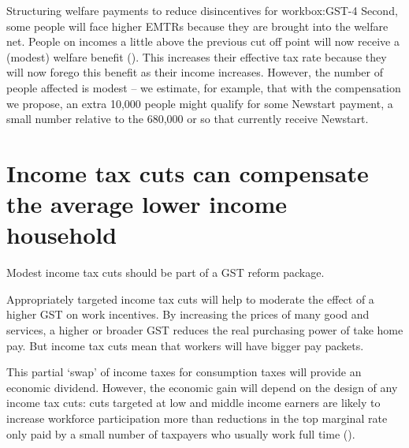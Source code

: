\begin{bigboxC*}{Structuring welfare payments to reduce disincentives for work}{box:GST-4}
Second, some people will face higher EMTRs because they are brought into the welfare net. People on incomes a little above the previous cut off point will now receive a (modest) welfare benefit (). This increases their effective tax rate because they will now forego this benefit as their income increases. However, the number of people affected is modest – we estimate, for example, that with the compensation we propose, an extra 10,000 people might qualify for some Newstart payment, a small number relative to the 680,000 or so that currently receive Newstart. 


\end{bigboxC*}

\section{Income tax cuts can compensate the average lower income household\label{sec:GST-3-4}}
Modest income tax cuts should be part of a GST reform package.

Appropriately targeted income tax cuts will help to moderate the effect of a higher GST on work incentives. By increasing the prices of many good and services, a higher or broader GST reduces the real purchasing power of take home pay. But income tax cuts mean that workers will have bigger pay packets. 

This partial ‘swap’ of income taxes for consumption taxes will provide an economic dividend. However, the economic gain will depend on the design of any income tax cuts: cuts targeted at low and middle income earners are likely to increase workforce participation more than reductions in the top marginal rate only paid by a small number of taxpayers who usually work full time (). 

